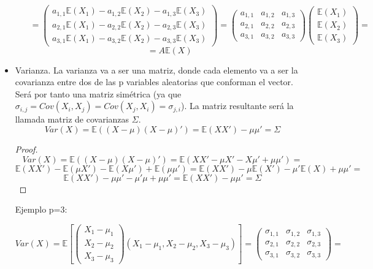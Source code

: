 \documentclass[palatino,nochap]{apuntes}
\begin{document}
\begin{itemize}
\begin{enumerate}
\[
=\left(
\begin{array}{c}
a_{1,1}\mathbb{E}(X_1) - a_{1,2}\mathbb{E}(X_2) - a_{1,3}\mathbb{E}(X_3)\\
a_{2,1}\mathbb{E}(X_1) - a_{2,2}\mathbb{E}(X_2) - a_{2,3}\mathbb{E}(X_3)\\
a_{3,1}\mathbb{E}(X_1) - a_{3,2}\mathbb{E}(X_2) - a_{3,3}\mathbb{E}(X_3)
\end{array}
\right)=
\left(
\begin{array}{ccc}
a_{1,1}& a_{1,2}& a_{1,3}\\
a_{2,1}& a_{2,2}& a_{2,3}\\
a_{3,1}& a_{3,2}& a_{3,3}
\end{array}
\right)
\left(
\begin{array}{c}
\mathbb{E}(X_1)\\
\mathbb{E}(X_2)\\
\mathbb{E}(X_3)
\end{array}
\right)=
\]
\[
=A\mathbb{E}(X)
\]

\end{enumerate}

\item Varianza. La varianza va a ser una matriz, donde cada elemento va a ser la covarianza entre dos de las p variables aleatorias que conforman el vector. Será por tanto una matriz simétrica (ya que $\sigma_{i,j}=Cov(X_i,X_j)=Cov(X_j,X_i)=\sigma_{j,i}$). La matriz resultante será la llamada matriz de covarianzas $\Sigma$.
\[
Var(X)=\mathbb{E}\left((X-\mu)(X-\mu)'\right) = \mathbb{E}(XX')-\mu \mu'=\Sigma
\]

\begin{proof}
\[
Var(X)=\mathbb{E}\left((X-\mu)(X-\mu)'\right) = \mathbb{E}(XX'- \mu X' - X \mu'+\mu \mu')=
\]
\[
\mathbb{E}(XX')-\mathbb{E}(\mu X')-\mathbb{E}(X\mu')+\mathbb{E}(\mu \mu')= \mathbb{E}(XX')-\mu \mathbb{E}(X')-\mu' \mathbb{E}(X)+\mu\mu'=
\]
\[
 \mathbb{E}(XX')-\mu \mu'-\mu' \mu+\mu \mu' = \mathbb{E}(XX')-\mu \mu'=\Sigma
\]
\end{proof}

Ejemplo p=3:

\[
Var(X)=
\mathbb{E}\left[
\left(
\begin{array}{c}
X_1-\mu_1\\
X_2-\mu_2\\
X_3-\mu_3
\end{array}
\right)
(X_1-\mu_1, X_2-\mu_2, X_3-\mu_3)\right]=
\left(
\begin{array}{ccc}
\sigma_{1,1}& \sigma_{1,2}& \sigma_{1,3} \\
\sigma_{2,1}& \sigma_{2,2}& \sigma_{2,3} \\
\sigma_{3,1}& \sigma_{3,2}& \sigma_{3,3}
\end{array}
\right)=
\]


\end{itemize}
\end{document}
